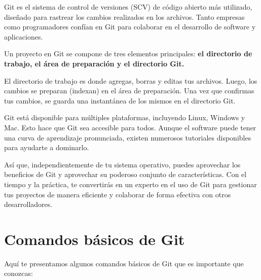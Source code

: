 \documentclass[
  letterpaper,
  DIV=11,
  numbers=noendperiod]{scrartcl}
\begin{document}
Git es el sistema de control de versiones (SCV) de código abierto más
utilizado, diseñado para rastrear los cambios realizados en los
archivos. Tanto empresas como programadores confían en Git para
colaborar en el desarrollo de software y aplicaciones.

Un proyecto en Git se compone de tres elementos principales: \textbf{el
directorio de trabajo, el área de preparación y el directorio Git.}

El directorio de trabajo es donde agregas, borras y editas tus archivos.
Luego, los cambios se preparan (indexan) en el área de preparación. Una
vez que confirmas tus cambios, se guarda una instantánea de los mismos
en el directorio Git.

Git está disponible para múltiples plataformas, incluyendo Linux,
Windows y Mac. Esto hace que Git sea accesible para todos. Aunque el
software puede tener una curva de aprendizaje pronunciada, existen
numerosos tutoriales disponibles para ayudarte a dominarlo.

Así que, independientemente de tu sistema operativo, puedes aprovechar
los beneficios de Git y aprovechar su poderoso conjunto de
características. Con el tiempo y la práctica, te convertirás en un
experto en el uso de Git para gestionar tus proyectos de manera
eficiente y colaborar de forma efectiva con otros desarrolladores.

\hypertarget{comandos-buxe1sicos-de-git}{%
\section{Comandos básicos de Git}\label{comandos-buxe1sicos-de-git}}

Aquí te presentamos algunos comandos básicos de Git que es importante
que conozcas:
\end{document}
